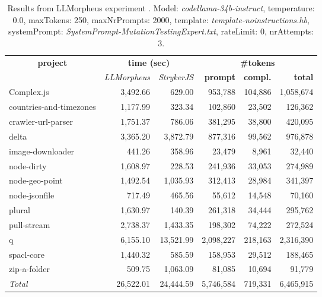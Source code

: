 
\begin{table*}[hbt!]
\centering
{\scriptsize
\begin{tabular}{l||r|r|r|r|r}
\multicolumn{1}{c|}{\bf project} & \multicolumn{2}{|c|}{\bf time (sec)} & \multicolumn{3}{|c|}{\bf \#tokens} \\
               & {\it LLMorpheus} & {\it StrykerJS} & {\bf prompt} & {\bf compl.} & {\bf total} \\
\hline
  Complex.js & 3,492.66 & 629.00 & 953,788 & 104,886 & 1,058,674 \\ 
countries-and-timezones & 1,177.99 & 323.34 & 102,860 & 23,502 & 126,362 \\ 
crawler-url-parser & 1,751.37 & 786.06 & 381,295 & 38,800 & 420,095 \\ 
delta & 3,365.20 & 3,872.79 & 877,316 & 99,562 & 976,878 \\ 
image-downloader & 441.26 & 358.96 & 23,479 & 8,961 & 32,440 \\ 
node-dirty & 1,608.97 & 228.53 & 241,936 & 33,053 & 274,989 \\ 
node-geo-point & 1,492.54 & 1,035.93 & 312,413 & 28,984 & 341,397 \\ 
node-jsonfile & 717.49 & 465.56 & 55,612 & 14,548 & 70,160 \\ 
plural & 1,630.97 & 140.39 & 261,318 & 34,444 & 295,762 \\ 
pull-stream & 2,738.37 & 1,433.35 & 198,302 & 74,222 & 272,524 \\ 
q & 6,155.10 & 13,521.99 & 2,098,227 & 218,163 & 2,316,390 \\ 
spacl-core & 1,440.32 & 585.59 & 158,953 & 29,512 & 188,465 \\ 
zip-a-folder & 509.75 & 1,063.09 & 81,085 & 10,694 & 91,779 \\ 
\hline
  \textit{Total} & 26,522.01 & 24,444.59 & 5,746,584 & 719,331 & 6,465,915 \\
  \end{tabular}
  }
  \\[2mm]
  \caption{Results from LLMorpheus experiment .
    Model: \textit{codellama-34b-instruct}, 
    temperature: 0.0, 
    maxTokens: 250, 
    maxNrPrompts: 2000, 
    template: \textit{template-noinstructions.hb}, 
    systemPrompt: \textit{SystemPrompt-MutationTestingExpert.txt}, 
    rateLimit: 0, 
    nrAttempts: 3.  
  }
  \label{table:Cost:run381:codellama-34b-instruct:template-noinstructions.hb:0.0}
\end{table*}